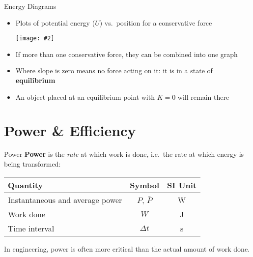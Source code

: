 \documentclass[12pt,compress,aspectratio=169]{beamer}
\newcommand{\pic}[2]{\texttt{[image: \#2]}}
\newcommand{\eq}[2]{\vspace{#1}{\Large\begin{displaymath}#2\end{displaymath}}}
\begin{document}
\begin{frame}{Energy Diagrams}
  \begin{itemize}
  \item Plots of potential energy ($U$) vs.\ position for a conservative force
    \begin{center}
      \pic{.5}{energy-diagram.png}
    \end{center}
  \item If more than one conservative force, they can be combined into one graph
  \item Where slope is zero means no force acting on it: it is in a state of
    \textbf{equilibrium}
  \item An object placed at an equilibrium point with $K=0$ will remain there
  \end{itemize}
\end{frame}


\section{Power \& Efficiency}

\begin{frame}{Power}
  \textbf{Power} is the \emph{rate} at which work is done, i.e.\ the rate at
  which energy is being transformed:

  \eq{-.3in}{
    \boxed{P = \frac{dW}{dt}}\quad\quad
    \boxed{\bar{P} = \frac{W}{\Delta t}}
  }
  \begin{center}
    \begin{tabular}{l|c|c}
      \rowcolor{pink}
      \textbf{Quantity}  & \textbf{Symbol} & \textbf{SI Unit} \\ \hline
      Instantaneous and average power & $P$, $\bar{P}$ & \si{\watt} \\
      Work done          & $W$ & \si{\joule} \\
      Time interval      & $\Delta t$ & \si{\second}
    \end{tabular}
  \end{center}
  In engineering, power is often more critical than the actual amount of work
  done.
\end{frame}
\end{document}
